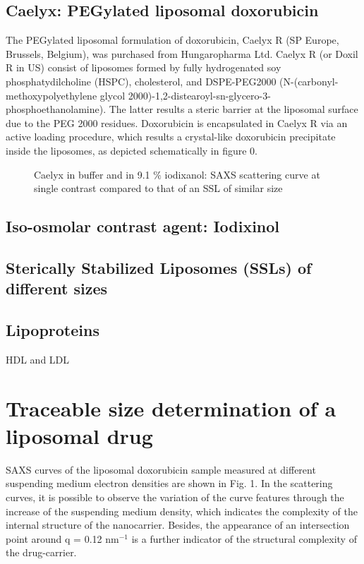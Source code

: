 \subsection{Caelyx: PEGylated liposomal doxorubicin}
The PEGylated liposomal formulation of doxorubicin, Caelyx R (SP Europe, Brussels, Belgium), was purchased from Hungaropharma Ltd. Caelyx R (or Doxil R in US) consist of liposomes formed by fully hydrogenated soy phosphatydilcholine (HSPC), cholesterol, and DSPE-PEG2000 (N-(carbonyl-methoxypolyethylene glycol 2000)-1,2-distearoyl-sn-glycero-3-phosphoethanolamine). The latter results a steric barrier at the liposomal surface due to the PEG 2000 residues. Doxorubicin is encapsulated in Caelyx R via an active loading procedure, which results a crystal-like doxorubicin precipitate inside the liposomes, as depicted schematically in figure 0. 

\begin{figure}
	\centering
		
		\caption{Caelyx in buffer and in 9.1 $\%$ iodixanol: SAXS scattering curve at single contrast compared to that of an SSL of similar size}
		\label{fig:CaelyxIodixanolSingleContrast}
\end{figure}

\subsection{Iso-osmolar contrast agent: Iodixinol}
\subsection{Sterically Stabilized Liposomes (SSLs) of different sizes}
\subsection{Lipoproteins}
HDL and LDL

\section{Traceable size determination of a liposomal drug}
SAXS curves of the liposomal doxorubicin sample measured at different suspending medium electron densities are shown in Fig. 1. In the scattering curves, it is possible to observe the variation of the curve features through the increase of the suspending medium density, which indicates the complexity of the internal structure of the nanocarrier. Besides, the appearance of an intersection point around q = 0.12 nm$^{-1}$ is a further indicator of the structural complexity of the drug-carrier.


